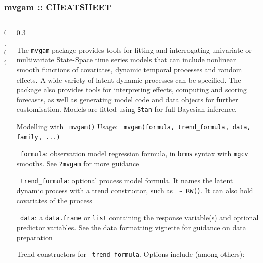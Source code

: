 \documentclass[final,9pt,fleqn]{beamer}\usepackage[]{graphicx}\usepackage[]{xcolor}
\begin{document}
\begin{frame}[fragile]
  \frametitle{{\fontsize{41}{43} \selectfont \textcolor{mygray}{mvgam ::}} {\fontsize{25}{25} \textbf{\textcolor{mygray}{CHEATSHEET}}}}
\vspace{-0.6in}
  \begin{columns}
    \begin{column}{0.02\paperwidth} %
    \end{column}

    \begin{column}{0.3\paperwidth}

\begin{block}
\noindent\makebox[\linewidth]{\rule{0.3\paperwidth}{0.2pt}}

The \texttt{mvgam} package provides tools for fitting and interrogating univariate or multivariate State-Space time series models that can include nonlinear smooth functions of covariates, dynamic temporal processes and random effects. A wide variety of latent dynamic processes can be specified. The package also provides tools for interpreting effects, computing and scoring forecasts, as well as generating model code and data objects for further customisation. Models are fitted using \texttt{Stan} for full Bayesian inference.

\end{block}

\begin{block}{{\fontsize{21}{21} \selectfont \color{BrickRed} Modelling with \texttt{\color{Orchid} mvgam()}}}
Usage: \texttt{\color{Orchid} mvgam(formula, trend\_formula, data, family, ...)}

\medskip
\texttt{\color{Orchid} formula}: observation model regression formula, in \texttt{brms} syntax with \texttt{mgcv} smooths. See \texttt{\color{Orchid}?mvgam} for more guidance

\medskip
\texttt{\color{Orchid} trend\_formula}: optional process model formula. It names the latent dynamic process with a trend constructor, such as \texttt{\color{Orchid} \textasciitilde{} RW()}. It can also hold covariates of the process

\medskip
\texttt{\color{Orchid} data}: a \texttt{data.frame} or \texttt{list} containing the response variable(s) and optional predictor variables. See \href{https://nicholasjclark.github.io/mvgam/articles/data.html}{the data formatting vignette} for guidance on data preparation

\medskip
Trend constructors for \texttt{\color{Orchid} trend\_formula}. Options include (among others):
\begin{itemize}


\end{itemize}
\end{block}
\end{column}
\end{columns}
\end{frame}
\end{document}
